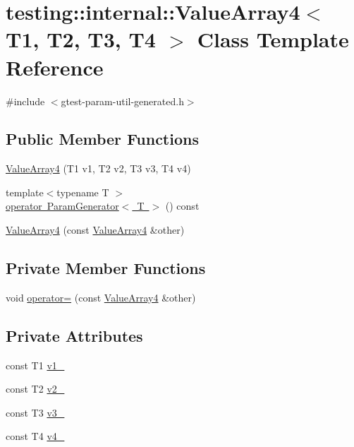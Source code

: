 \hypertarget{classtesting_1_1internal_1_1_value_array4}{}\section{testing\+::internal\+::Value\+Array4$<$ T1, T2, T3, T4 $>$ Class Template Reference}
\label{classtesting_1_1internal_1_1_value_array4}


{\ttfamily \#include $<$gtest-\/param-\/util-\/generated.\+h$>$}

\subsection*{Public Member Functions}
\begin{DoxyCompactItemize}
\item 
\mbox{\hyperlink{classtesting_1_1internal_1_1_value_array4_a5288bbb1a3149842ab13d689cf1fd48f}{Value\+Array4}} (T1 v1, T2 v2, T3 v3, T4 v4)
\item 
{\footnotesize template$<$typename T $>$ }\\\mbox{\hyperlink{classtesting_1_1internal_1_1_value_array4_aef21f582b20423f5fb8515d9879ad557}{operator Param\+Generator$<$ T $>$}} () const
\item 
\mbox{\hyperlink{classtesting_1_1internal_1_1_value_array4_a3703e95dc214c47d705cf68fdf2e262b}{Value\+Array4}} (const \mbox{\hyperlink{classtesting_1_1internal_1_1_value_array4}{Value\+Array4}} \&other)
\end{DoxyCompactItemize}
\subsection*{Private Member Functions}
\begin{DoxyCompactItemize}
\item 
void \mbox{\hyperlink{classtesting_1_1internal_1_1_value_array4_a64e458dff48a9e883a27fd8b14e2dc6a}{operator=}} (const \mbox{\hyperlink{classtesting_1_1internal_1_1_value_array4}{Value\+Array4}} \&other)
\end{DoxyCompactItemize}
\subsection*{Private Attributes}
\begin{DoxyCompactItemize}
\item 
const T1 \mbox{\hyperlink{classtesting_1_1internal_1_1_value_array4_a770124418ecfeb4ee612f5d976c21ece}{v1\+\_\+}}
\item 
const T2 \mbox{\hyperlink{classtesting_1_1internal_1_1_value_array4_ab5fcaf4076ea60d16b3b2dc5cb8c958e}{v2\+\_\+}}
\item 
const T3 \mbox{\hyperlink{classtesting_1_1internal_1_1_value_array4_aae12259825c1feabddd71e5856c3b64f}{v3\+\_\+}}
\item 
const T4 \mbox{\hyperlink{classtesting_1_1internal_1_1_value_array4_af22a84df122c40d8f2ec6a82acdd7d14}{v4\+\_\+}}
\end{DoxyCompactItemize}


